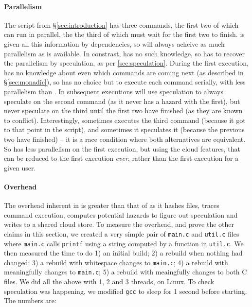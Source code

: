 \paragraph{Parallelism} The script from \S\ref{sec:introduction} has three commands, the first two of which can run in parallel, the the third of which must wait for the first two to finish. \Make is given all this information by dependencies, so will always acheive as much parallelism as is available. In constrast, \Rattle has no such knowledge, so has to recover the parallelism by speculation, as per \ref{sec:speculation}. During the first execution, \Rattle has no knowledge about even which commands are coming next (as described in \S\ref{sec:monadic}), so has no choice but to execute each command serially, with less parallelism than \Make. In subsequent executions \Rattle will use speculation to always speculate on the second command (as it never has a hazard with the first), but never speculate on the third until the first two have finished (as they are known to conflict). Interestingly, sometimes \Rattle executes the third command (because it got to that point in the script), and sometimes it speculates it (because the previous two have finished) -- it is a race condition where both alternatives are equivalent. So \Rattle has less parallelism on the first execution, but using the cloud features, that can be reduced to the first execution \emph{ever}, rather than the first execution for a given user.

\paragraph{Overhead} The overhead inherent in \Rattle is greater than that of \Make as it hashes files, traces command execution, computes potential hazards to figure out speculation and writes to a shared cloud store. To measure the overhead, and prove the other claims in this section, we created a very simple pair of \texttt{main.c} and \texttt{util.c} files where \texttt{main.c} calls \texttt{printf} using a string computed by a function in \texttt{util.c}. We then measured the time to do 1) an initial build; 2) a rebuild when nothing had changed; 3) a rebuild with whitespace changes to \texttt{main.c}; 4) a rebuild with meaningfully changes to \texttt{main.c}; 5) a rebuild with meaingfully changes to both C files. We did all the above with 1, 2 and 3 threads, on Linux. To check speculation was happening, we modified \texttt{gcc} to sleep for 1 second before starting. The numbers are:

